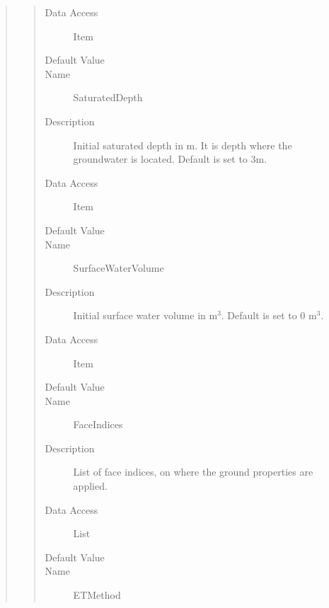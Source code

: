 \documentclass[letterpaper,10pt,english]{sphinxmanual}
\begin{document}
\begin{quote}
\begin{description}
\begin{quote}
\begin{description}
\item[{Data Access}] \leavevmode
Item

\item[{Default Value}] \leavevmode
{}

\item[{Name}] \leavevmode
SaturatedDepth

\item[{Description}] \leavevmode
Initial saturated depth in m. It is depth where the groundwater is located. Default is set to 3m.

\item[{Data Access}] \leavevmode
Item

\item[{Default Value}] \leavevmode
{}

\item[{Name}] \leavevmode
SurfaceWaterVolume

\item[{Description}] \leavevmode
Initial surface water volume in m$^{\text{3}}$. Default is set to 0 m$^{\text{3}}$.

\item[{Data Access}] \leavevmode
Item

\item[{Default Value}] \leavevmode
{}

\item[{Name}] \leavevmode
FaceIndices

\item[{Description}] \leavevmode
List of face indices, on where the ground properties are applied.

\item[{Data Access}] \leavevmode
List

\item[{Default Value}] \leavevmode
{}

\item[{Name}] \leavevmode
ETMethod


\end{description}
\end{quote}
\end{description}
\end{quote}
\end{document}
